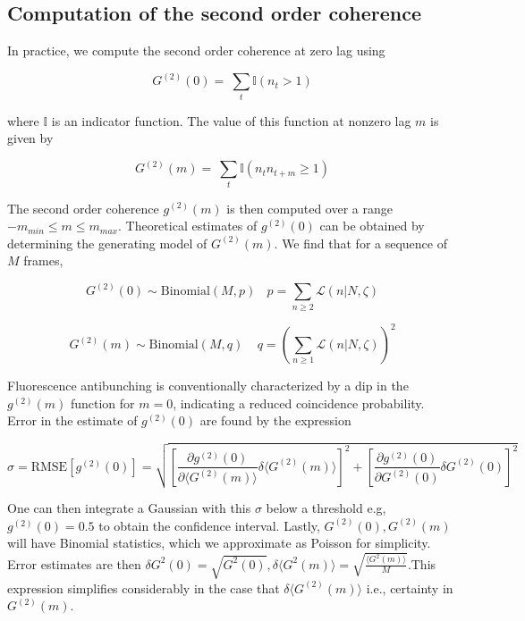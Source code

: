 \subsection{Computation of the second order coherence}

In practice, we compute the second order coherence at zero lag using

\begin{equation*}
G^{(2)}(0) =\ \sum_{t}{\mathbb{I}(n_t>1)}
\end{equation*}

where $\mathbb{I}$ is an indicator function. The value of this function at nonzero lag $m$ is given by

\begin{equation*}
G^{(2)}(m) =\ \sum_{t}{\mathbb{I}(n_t n_{t+m}\geq1)}
\end{equation*}

The second order coherence $g^{(2)}(m)$ is then computed over a range $-m_{min}\le m\le m_{max}$. Theoretical estimates of $g^{(2)}(0)$ can be obtained by determining the generating model of $G^{(2)}(m)$. We find that for a sequence of $M$ frames,

\begin{equation*}
G^{(2)}(0)\sim \mathrm{Binomial}(M,p)\ \ \ \ p=\sum_{n\geq2}{\mathcal{L}(n\lvert N,\zeta)}
\end{equation*}

\begin{equation*}
G^{(2)}(m)\sim \mathrm{Binomial}\left(M,q\right)\ \ \ \ \ q=\left(\sum_{n\geq1}{\mathcal{L}(n\lvert N,\zeta)}\right)^2
\end{equation*}

Fluorescence antibunching is conventionally characterized by a dip in the $g^{(2)}(m)$ function for $m=0$, indicating a reduced coincidence probability. Error in the estimate of $g^{(2)}(0)$ are found by the expression


\begin{equation}
\sigma = \text{RMSE}[g^{(2)}(0)] = \sqrt{
    \left[
    \frac{\partial g^{(2)}(0)}{\partial \langle G^{(2)}(m) \rangle} \delta \langle G^{(2)}(m) \rangle
    \right]^2 +
    \left[
    \frac{\partial g^{(2)}(0)}{\partial G^{(2)}(0)} \delta G^{(2)}(0)
    \right]^2
}
\end{equation}

One can then integrate a Gaussian with this $\sigma$ below a threshold e.g, $g^{(2)}(0)=0.5$ to obtain the confidence interval. Lastly, $G^{(2)}(0),G^{(2)}(m)$ will have Binomial statistics, which we approximate as Poisson for simplicity. Error estimates are then $\delta G^2(0) = \sqrt{G^2(0)}, \delta \langle G^2(m)\rangle = \sqrt{\frac{\langle G^2(m)\rangle}{M}}$.This expression simplifies considerably in the case that $\delta \langle G^{(2)}(m)\rangle$ i.e., certainty in $G^{(2)}(m)$. 

